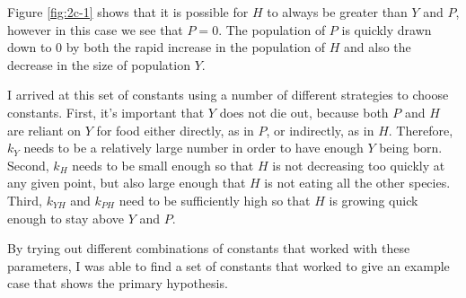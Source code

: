 \documentclass[12pt]{article}
\begin{document}
\begin{enumerate}
\begin{enumerate}
      Figure \ref{fig:2c-1} shows that it is possible for $H$ to always be greater than $Y$ and $P$, however in this case we see that $P = 0$. The population of $P$ is quickly drawn down to 0 by both the rapid increase in the population of $H$ and also the decrease in the size of population $Y$.
      
      I arrived at this set of constants using a number of different strategies to choose constants. First, it's important that $Y$ does not die out, because both $P$ and $H$ are reliant on $Y$ for food either directly, as in $P$, or indirectly, as in $H$. Therefore, $k_{Y}$ needs to be a relatively large number in order to have enough $Y$ being born. Second, $k_{H}$ needs to be small enough so that $H$ is not decreasing too quickly at any given point, but also large enough that $H$ is not eating all the other species. Third, $k_{YH}$ and $k_{PH}$ need to be sufficiently high so that $H$ is growing quick enough to stay above $Y$ and $P$.
      
      By trying out different combinations of constants that worked with these parameters, I was able to find a set of constants that worked to give an example case that shows the primary hypothesis.
  		
  	\end{enumerate}  
  
  \end{enumerate}
\end{document}

